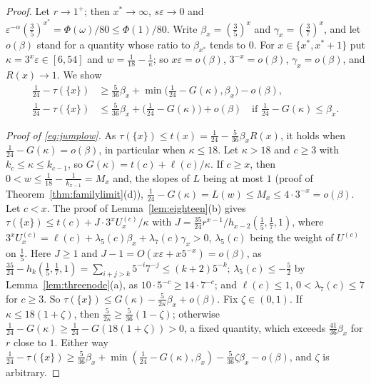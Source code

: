 \documentclass[11pt]{article}
\begin{document}
\begin{proof}
Let $r\to1^+$; then $x^*\to\infty$, $s\varepsilon\to0$ and
$\varepsilon^{-\alpha}(\tfrac35)^{x^*}=\Phi(\omega)/80\le\Phi(1)/80$.  Write
$\beta_x=(\tfrac35)^x$ and $\gamma_x=(\tfrac37)^x$, and let $o(\beta)$ stand
for a quantity whose ratio to $\beta_{x^*}$ tends to $0$.  For
$x\in\{x^*,x^*+1\}$ put $\kappa=3^x\varepsilon\in[6,54]$ and
$w=\tfrac1{18}-\tfrac1\kappa$; so $x\varepsilon=o(\beta)$, $3^{-x}=o(\beta)$,
$\gamma_x=o(\beta)$, and $R(x)\to1$.  We show
\begin{align}
  \tfrac1{24}-\tau(\{x\})&\ge\tfrac5{36}\beta_x+\min\bigl(\tfrac1{24}-G(\kappa),\beta_x\bigr)-o(\beta),
  \label{eq:jumplow}\\
  \tfrac1{24}-\tau(\{x\})&\le\tfrac5{36}\beta_x+\bigl(\tfrac1{24}-G(\kappa)\bigr)+o(\beta)
  \quad\text{if }\tfrac1{24}-G(\kappa)\le\beta_x .\label{eq:jumpup}
\end{align}

\emph{Proof of \eqref{eq:jumplow}.}  As $\tau(\{x\})\le t(x)=\tfrac1{24}-\tfrac5{36}\beta_xR(x)$,
it holds when $\tfrac1{24}-G(\kappa)=o(\beta)$, in particular when
$\kappa\le18$.  Let $\kappa>18$ and $c\ge3$ with $k_c\le\kappa\le k_{c-1}$,
so $G(\kappa)=t(c)+\ell(c)/\kappa$.  If $c\ge x$, then
$0<w\le\tfrac1{18}-\tfrac1{k_{x-1}}=M_x$ and, the slopes of $L$ being at
most $1$ (proof of Theorem~\ref{thm:familylimit}(d)),
$\tfrac1{24}-G(\kappa)=L(w)\le M_x\le4\cdot3^{-x}=o(\beta)$.  Let $c<x$.  The
proof of Lemma~\ref{lem:eighteen}(b) gives
$\tau(\{x\})\le t(c)+J\cdot3^xU^{(c)}_x/\kappa$ with
$J=\tfrac{35}{24}r^{x-1}/h_{x-2}(\tfrac15,\tfrac17,1)$, where
$3^xU^{(c)}_x=\ell(c)+\lambda_5(c)\beta_x+\lambda_7(c)\gamma_x>0$,
$\lambda_5(c)$ being the weight of $U^{(c)}$ on $\tfrac15$.  Here $J\ge1$ and
$J-1=O(x\varepsilon+x5^{-x})=o(\beta)$, as
$\tfrac{35}{24}-h_k(\tfrac15,\tfrac17,1)=\sum_{i+j>k}5^{-i}7^{-j}\le(k+2)5^{-k}$;
$\lambda_5(c)\le-\tfrac52$ by Lemma~\ref{lem:threenode}(a), as
$10\cdot5^{-c}\ge14\cdot7^{-c}$; and
$\ell(c)\le1$, $0<\lambda_7(c)\le7$ for $c\ge3$.  So
$\tau(\{x\})\le G(\kappa)-\tfrac5{2\kappa}\beta_x+o(\beta)$.  Fix
$\zeta\in(0,1)$.  If $\kappa\le18(1+\zeta)$, then
$\tfrac5{2\kappa}\ge\tfrac5{36}(1-\zeta)$; otherwise
$\tfrac1{24}-G(\kappa)\ge\tfrac1{24}-G(18(1+\zeta))>0$, a fixed quantity,
which exceeds $\tfrac{41}{36}\beta_x$ for $r$ close to $1$.  Either way
$\tfrac1{24}-\tau(\{x\})\ge\tfrac5{36}\beta_x+\min(\tfrac1{24}-G(\kappa),\beta_x)
-\tfrac5{36}\zeta\beta_x-o(\beta)$, and $\zeta$ is arbitrary.


\end{proof}
\end{document}
